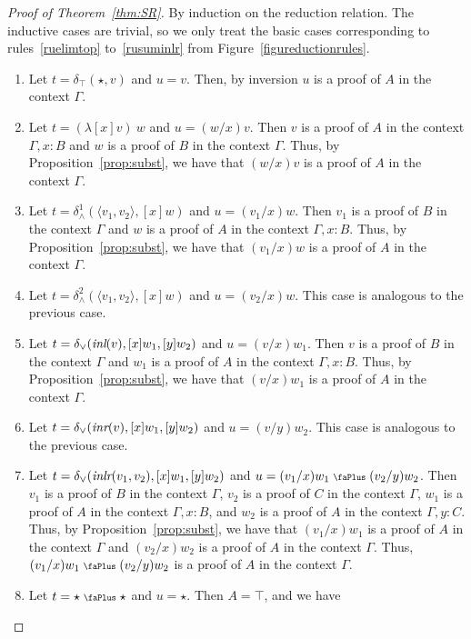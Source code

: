 \documentclass[screen, sigconf,authorversion,nonacm]{acmart}
\theoremstyle{acmdefinition}
\numberwithin{equation}{section}
\newcommand\abstr[1]{[#1]}
\newcommand\inl{\mbox{\it inl}}
\newcommand\inr{\mbox{\it inr}}
\newcommand\inlr{\mbox{\it inlr}}
\newcommand\elimtop{\delta_{\top}}
\newcommand\elimand{\delta_{\wedge}}
\newcommand\elimor{\delta_{\vee}}
\newcommand\plus{\mathrel{\text{\normalfont\scalebox{0.7}{\faPlus}}}}
\newcommand\pair[2]{\langle #1, #2 \rangle}
\begin{document}
\begin{proof}[Proof of Theorem~\ref{thm:SR}]
  By induction on the reduction relation. The inductive cases are trivial, so we
  only treat the basic cases corresponding to rules~\eqref{ruelimtop}
  to~\eqref{rusuminlr} from Figure~\ref{figureductionrules}.
  \begin{enumerate}
    \item Let $t=\elimtop(\star, v)$ and $u=v$. Then, by inversion $u$ is a
      proof of $A$ in the context $\Gamma$.
    \item Let $t=(\lambda \abstr{x}v)~w$ and $u=(w/x)v$. Then $v$ is a proof
      of $A$ in the context $\Gamma,x:B$ and $w$ is a proof of $B$ in the
      context $\Gamma$. Thus, by Proposition~\ref{prop:subst}, we have that
      $(w/x)v$ is a proof of $A$ in the context $\Gamma$.
    \item Let $t=\elimand^1(\pair{v_1}{v_2}, \abstr{x}w)$ and $u=(v_1/x)w$.
      Then $v_1$ is a proof of $B$ in the context $\Gamma$ and $w$ is a proof
      of $A$ in the context $\Gamma,x:B$. Thus, by
      Proposition~\ref{prop:subst}, we have that $(v_1/x)w$ is a proof of $A$
      in the context $\Gamma$.
    \item Let $t=\elimand^2(\pair{v_1}{v_2}, \abstr{x}w)$ and $u=(v_2/x)w$.
      This case is analogous to the previous case.
    \item Let $t=\elimor(\inl(v),\abstr{x}w_1,\abstr{y}w_2)$ and $u=(v/x)w_1$.
      Then $v$ is a proof of $B$ in the context $\Gamma$ and $w_1$ is a proof
      of $A$ in the context $\Gamma,x:B$. Thus, by
      Proposition~\ref{prop:subst}, we have that $(v/x)w_1$ is a proof of $A$
      in the context $\Gamma$.
    \item Let $t=\elimor(\inr(v),\abstr{x}w_1,\abstr{y}w_2)$ and $u=(v/y)w_2$.
      This case is analogous to the previous case.
    \item Let $t=\elimor(\inlr(v_1,v_2),\abstr{x}w_1,\abstr{y}w_2)$ and $u=(v_1/x)w_1 \plus (v_2/y)w_2$.
      Then 
      $v_1$ is a proof of $B$ in the context $\Gamma$,
      $v_2$ is a proof of $C$ in the context $\Gamma$,
      $w_1$ is a proof of $A$ in the context $\Gamma,x:B$, and
      $w_2$ is a proof of $A$ in the context $\Gamma,y:C$.
      Thus, by Proposition~\ref{prop:subst}, we have that
      $(v_1/x)w_1$ is a proof of $A$ in the context $\Gamma$ and 
      $(v_2/x)w_2$ is a proof of $A$ in the context $\Gamma$.
      Thus, $(v_1/x)w_1 \plus (v_2/y)w_2$ is a proof of $A$ in the context $\Gamma$.
    \item Let $t=\star \plus \star$ and $u=\star$. Then $A=\top$, and we have

\end{enumerate}
\end{proof}
\end{document}
